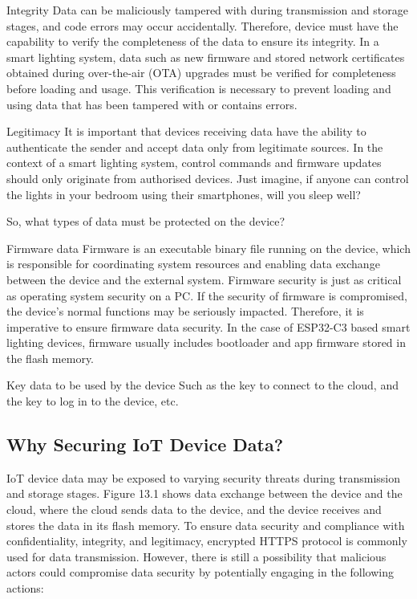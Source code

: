\documentclass[a4paper,12pt]{book}
\begin{document}
\begin{term}{Integrity}
    Data can be maliciously tampered with during transmission and storage stages, and code errors may occur accidentally. Therefore, device must have the capability to verify the completeness of the data to ensure its integrity. In a smart lighting system, data such as new firmware and stored network certificates obtained during over-the-air (OTA) upgrades must be verified for completeness before loading and usage. This verification is necessary to prevent loading and using data that has been tampered with or contains errors.
\end{term}

\begin{term}{Legitimacy}
    It is important that devices receiving data have the ability to authenticate the sender and accept data only from legitimate sources. In the context of a smart lighting system, control commands and firmware updates should only originate from authorised devices. Just imagine, if anyone can control the lights in your bedroom using their smartphones, will you sleep well?
\end{term}

So, what types of data must be protected on the device?

\begin{term}{Firmware data}
    Firmware is an executable binary file running on the device, which is responsible for coordinating system resources and enabling data exchange between the device and the external system. Firmware security is just as critical as operating system security on a PC. If the security of firmware is compromised, the device's normal functions may be seriously impacted. Therefore, it is imperative to ensure firmware data security. In the case of ESP32-C3 based smart lighting devices, firmware usually includes bootloader and app firmware stored in the flash memory.
\end{term}

\begin{term}{Key data to be used by the device}
    Such as the key to connect to the cloud, and the key to log in to the device, etc.
\end{term}

\subsection{Why Securing IoT Device Data?}
IoT device data may be exposed to varying security threats during transmission and storage stages. Figure 13.1 shows data exchange between the device and the cloud, where the cloud sends data to the device, and the device receives and stores the data in its flash memory. To ensure data security and compliance with confidentiality, integrity, and legitimacy, encrypted HTTPS protocol is commonly used for data transmission. However, there is still a possibility that malicious actors could compromise data security by potentially engaging in the following actions:
\end{document}
